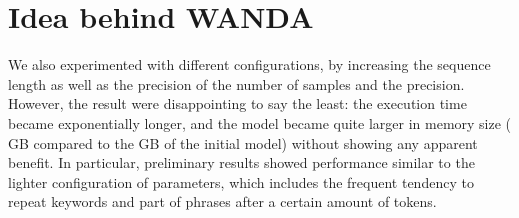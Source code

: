 \section{Idea behind WANDA}
We also experimented with different configurations, by increasing the sequence length as well as the precision of the number of samples and the precision. 
However, the result were disappointing to say the least: the execution time became exponentially longer, and the model became quite larger in memory size ( GB compared to the  GB of the initial model)
 without showing any apparent benefit. In particular, preliminary results showed performance similar to the lighter configuration of parameters, which includes the frequent
 tendency to repeat keywords and part of phrases after a certain amount of tokens.